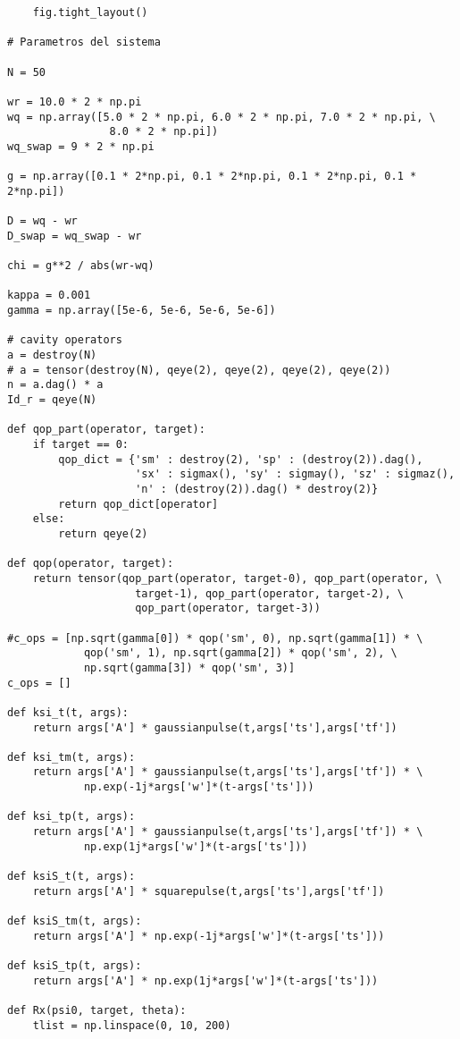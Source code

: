 \begin{verbatim}
    fig.tight_layout()

# Parametros del sistema

N = 50

wr = 10.0 * 2 * np.pi
wq = np.array([5.0 * 2 * np.pi, 6.0 * 2 * np.pi, 7.0 * 2 * np.pi, \
                8.0 * 2 * np.pi])
wq_swap = 9 * 2 * np.pi

g = np.array([0.1 * 2*np.pi, 0.1 * 2*np.pi, 0.1 * 2*np.pi, 0.1 * 2*np.pi])

D = wq - wr
D_swap = wq_swap - wr

chi = g**2 / abs(wr-wq)

kappa = 0.001
gamma = np.array([5e-6, 5e-6, 5e-6, 5e-6])

# cavity operators
a = destroy(N)
# a = tensor(destroy(N), qeye(2), qeye(2), qeye(2), qeye(2))
n = a.dag() * a
Id_r = qeye(N)

def qop_part(operator, target):
    if target == 0:
        qop_dict = {'sm' : destroy(2), 'sp' : (destroy(2)).dag(), 
                    'sx' : sigmax(), 'sy' : sigmay(), 'sz' : sigmaz(),
                    'n' : (destroy(2)).dag() * destroy(2)}
        return qop_dict[operator]
    else:
        return qeye(2)

def qop(operator, target):
    return tensor(qop_part(operator, target-0), qop_part(operator, \
                    target-1), qop_part(operator, target-2), \
                    qop_part(operator, target-3))
    
#c_ops = [np.sqrt(gamma[0]) * qop('sm', 0), np.sqrt(gamma[1]) * \
            qop('sm', 1), np.sqrt(gamma[2]) * qop('sm', 2), \
            np.sqrt(gamma[3]) * qop('sm', 3)]
c_ops = []

def ksi_t(t, args):
    return args['A'] * gaussianpulse(t,args['ts'],args['tf'])

def ksi_tm(t, args):
    return args['A'] * gaussianpulse(t,args['ts'],args['tf']) * \
            np.exp(-1j*args['w']*(t-args['ts']))

def ksi_tp(t, args):
    return args['A'] * gaussianpulse(t,args['ts'],args['tf']) * \
            np.exp(1j*args['w']*(t-args['ts']))

def ksiS_t(t, args):
    return args['A'] * squarepulse(t,args['ts'],args['tf'])

def ksiS_tm(t, args):
    return args['A'] * np.exp(-1j*args['w']*(t-args['ts']))

def ksiS_tp(t, args):
    return args['A'] * np.exp(1j*args['w']*(t-args['ts']))

def Rx(psi0, target, theta):
    tlist = np.linspace(0, 10, 200)


\end{verbatim}
